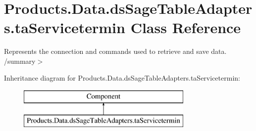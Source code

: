 \hypertarget{class_products_1_1_data_1_1ds_sage_table_adapters_1_1ta_servicetermin}{}\section{Products.\+Data.\+ds\+Sage\+Table\+Adapters.\+ta\+Servicetermin Class Reference}
\label{class_products_1_1_data_1_1ds_sage_table_adapters_1_1ta_servicetermin}


Represents the connection and commands used to retrieve and save data. /summary$>$  


Inheritance diagram for Products.\+Data.\+ds\+Sage\+Table\+Adapters.\+ta\+Servicetermin\+:\begin{figure}[H]
\begin{center}
\leavevmode
\includegraphics[height=2.000000cm]{class_products_1_1_data_1_1ds_sage_table_adapters_1_1ta_servicetermin}
\end{center}
\end{figure}

